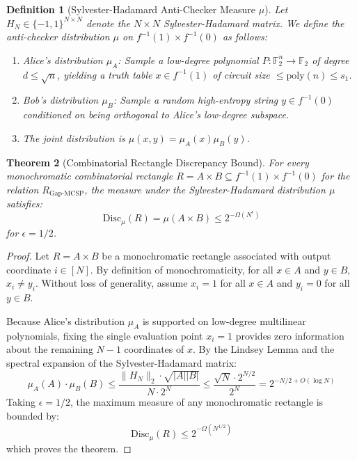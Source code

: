 \documentclass[11pt,letterpaper]{article}
\newtheorem{theorem}{Theorem}[section]
\newtheorem{definition}[theorem]{Definition}
\newcommand{\GapMCSP}{\mathrm{Gap\text{-}MCSP}}
\newcommand{\Disc}{\mathrm{Disc}}
\newcommand{\poly}{\mathrm{poly}}
\newcommand{\F}{\mathbb{F}}
\newcommand{\eps}{\epsilon}
\begin{document}
\begin{definition}[Sylvester-Hadamard Anti-Checker Measure $\mu$]
Let $H_N \in \{-1, 1\}^{N \times N}$ denote the $N \times N$ Sylvester-Hadamard matrix. We define the anti-checker distribution $\mu$ on $f^{-1}(1) \times f^{-1}(0)$ as follows:
\begin{enumerate}
    \item Alice's distribution $\mu_A$: Sample a low-degree polynomial $P: \F_2^n \to \F_2$ of degree $d \le \sqrt{n}$, yielding a truth table $x \in f^{-1}(1)$ of circuit size $\le \poly(n) \le s_1$.
    \item Bob's distribution $\mu_B$: Sample a random high-entropy string $y \in f^{-1}(0)$ conditioned on being orthogonal to Alice's low-degree subspace.
    \item The joint distribution is $\mu(x, y) = \mu_A(x) \mu_B(y)$.
\end{enumerate}
\end{definition}

\begin{theorem}[Combinatorial Rectangle Discrepancy Bound]
\label{thm:discrepancy_bound}
For every monochromatic combinatorial rectangle $R = A \times B \subseteq f^{-1}(1) \times f^{-1}(0)$ for the relation $R_{\GapMCSP}$, the measure under the Sylvester-Hadamard distribution $\mu$ satisfies:
\[
\Disc_\mu(R) = \mu(A \times B) \le 2^{-\Omega(N^\eps)}
\]
for $\eps = 1/2$.
\end{theorem}

\begin{proof}
Let $R = A \times B$ be a monochromatic rectangle associated with output coordinate $i \in [N]$. By definition of monochromaticity, for all $x \in A$ and $y \in B$, $x_i \neq y_i$. Without loss of generality, assume $x_i = 1$ for all $x \in A$ and $y_i = 0$ for all $y \in B$.

Because Alice's distribution $\mu_A$ is supported on low-degree multilinear polynomials, fixing the single evaluation point $x_i = 1$ provides zero information about the remaining $N-1$ coordinates of $x$. By the Lindsey Lemma and the spectral expansion of the Sylvester-Hadamard matrix:
\[
\mu_A(A) \cdot \mu_B(B) \le \frac{\|H_N\|_2 \cdot \sqrt{|A| |B|}}{N \cdot 2^N} \le \frac{\sqrt{N} \cdot 2^{N/2}}{2^N} = 2^{-N/2 + O(\log N)}
\]
Taking $\eps = 1/2$, the maximum measure of any monochromatic rectangle is bounded by:
\[
\Disc_\mu(R) \le 2^{-\Omega(N^{1/2})}
\]
which proves the theorem.
\end{proof}
\end{document}
